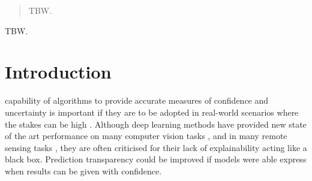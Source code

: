 \documentclass[journal]{IEEEtran}
\begin{document}


\maketitle

\begin{abstract}
TBW.
\end{abstract}

\begin{IEEEkeywords}
TBW.
\end{IEEEkeywords}

%
\IEEEpeerreviewmaketitle

\section{Introduction}
% 
% 
% 
% 
 capability of algorithms to provide accurate measures of confidence and uncertainty is important if they are to be adopted in real-world scenarios where the stakes can be high \cite{Goodman_Flaxman_2017}. Although deep learning methods have provided new state of the art performance on many computer vision tasks \cite{lecun2015deeplearning}, and in many remote sensing tasks \cite{zhang2016deep}, they are often criticised for their lack of explainability \cite{pmlr_v70_guo17a} acting like a black box. Prediction transparency could be improved if models were able express when results can be given with confidence.
\end{document}
